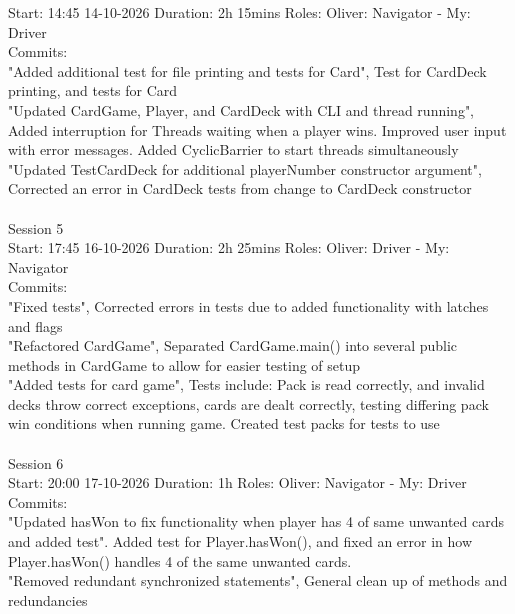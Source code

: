 \documentclass[11p]{article}
\begin{document}
Start: 14:45 14-10-2026
Duration: 2h 15mins
Roles:  Oliver: Navigator - My: Driver\\
Commits:\\
"Added additional test for file printing and tests for Card", Test for CardDeck printing, and tests for Card\\
"Updated CardGame, Player, and CardDeck with CLI and thread running", Added interruption for Threads waiting when a player wins. Improved user input with error messages.  Added CyclicBarrier to start threads simultaneously\\
"Updated TestCardDeck for additional playerNumber constructor argument", Corrected an error in CardDeck tests from change to CardDeck constructor\\\\
Session 5\\
Start: 17:45 16-10-2026
Duration: 2h 25mins
Roles:  Oliver: Driver - My: Navigator \\
Commits:\\
"Fixed tests", Corrected errors in tests due to added functionality with latches and flags\\
"Refactored CardGame", Separated CardGame.main() into several public methods in CardGame to allow for easier testing of setup\\
"Added tests for card game", Tests include: Pack is read correctly, and invalid decks throw correct exceptions, cards are dealt correctly, testing differing pack win conditions when running game. Created test packs for tests to use\\\\
Session 6\\
Start: 20:00 17-10-2026
Duration: 1h
Roles:  Oliver: Navigator - My: Driver\\
Commits:\\
"Updated hasWon to fix functionality when player has 4 of same unwanted cards and added test". Added test for Player.hasWon(), and fixed an error in how Player.hasWon() handles 4 of the same unwanted cards.\\
"Removed redundant synchronized statements", General clean up of methods and redundancies
\end{document}
